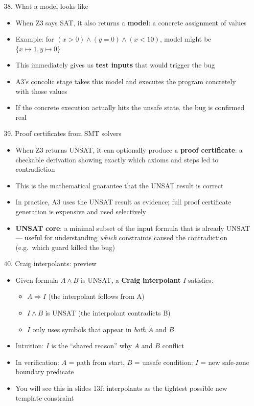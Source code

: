 \documentclass[aspectratio=169]{beamer}
\begin{document}
\begin{frame}{38. What a model looks like}
\begin{itemize}
  \item When Z3 says SAT, it also returns a \textbf{model}: a concrete assignment of values
  \item Example: for \((x > 0) \wedge (y = 0) \wedge (x < 10)\), model might be \(\{x \mapsto 1, y \mapsto 0\}\)
  \item This immediately gives us \textbf{test inputs} that would trigger the bug
  \item A3's concolic stage takes this model and executes the program concretely with those values
  \item If the concrete execution actually hits the unsafe state, the bug is confirmed real
\end{itemize}
\end{frame}

\begin{frame}{39. Proof certificates from SMT solvers}
\begin{itemize}
  \item When Z3 returns UNSAT, it can optionally produce a \textbf{proof certificate}: a checkable
    derivation showing exactly which axioms and steps led to contradiction
  \item This is the mathematical guarantee that the UNSAT result is correct
  \item In practice, A3 uses the UNSAT result as evidence; full proof certificate generation is
    expensive and used selectively
  \item \textbf{UNSAT core}: a minimal subset of the input formula that is already UNSAT
    --- useful for understanding \emph{which} constraints caused the contradiction (e.g.\ which guard killed the bug)
\end{itemize}
\end{frame}

\begin{frame}{40. Craig interpolants: preview}
\begin{itemize}
  \item Given formula \(A \wedge B\) is UNSAT, a \textbf{Craig interpolant} \(I\) satisfies:
    \begin{itemize}
      \item \(A \Rightarrow I\) (the interpolant follows from A)
      \item \(I \wedge B\) is UNSAT (the interpolant contradicts B)
      \item \(I\) only uses symbols that appear in \emph{both} \(A\) and \(B\)
    \end{itemize}
  \item Intuition: \(I\) is the ``shared reason'' why \(A\) and \(B\) conflict
  \item In verification: \(A\) = path from start, \(B\) = unsafe condition; \(I\) = new safe-zone boundary predicate
  \item You will see this in slides 13f: interpolants as the tightest possible new template constraint
\end{itemize}
\end{frame}
\end{document}
